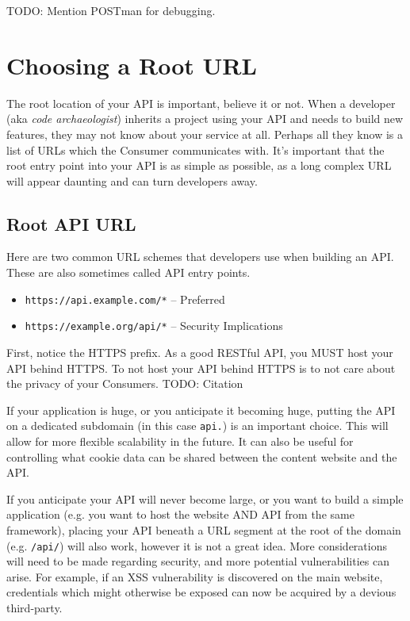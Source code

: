 \documentclass{book}
\begin{document}
TODO: Mention POSTman for debugging.


\section{Choosing a Root URL}

The root location of your API is important, believe it or not. When a developer (aka \emph{code archaeologist}) inherits a project using your API and needs to build new features, they may not know about your service at all. Perhaps all they know is a list of URLs which the Consumer communicates with. It's important that the root entry point into your API is as simple as possible, as a long complex URL will appear daunting and can turn developers away.

\subsection{Root API URL}

Here are two common URL schemes that developers use when building an API. These are also sometimes called API entry points.

\begin{itemize}
\item \texttt{https://api.example.com/*} -- Preferred
\item \texttt{https://example.org/api/*} -- Security Implications
\end{itemize}

First, notice the HTTPS prefix. As a good RESTful API, you MUST host your API behind HTTPS. To not host your API behind HTTPS is to not care about the privacy of your Consumers. TODO: Citation

If your application is huge, or you anticipate it becoming huge, putting the API on a dedicated subdomain (in this case \texttt{api.}) is an important choice. This will allow for more flexible scalability in the future. It can also be useful for controlling what cookie data can be shared between the content website and the API.

If you anticipate your API will never become large, or you want to build a simple application (e.g. you want to host the website AND API from the same framework), placing your API beneath a URL segment at the root of the domain (e.g. \texttt{/api/}) will also work, however it is not a great idea. More considerations will need to be made regarding security, and more potential vulnerabilities can arise. For example, if an XSS vulnerability is discovered on the main website, credentials which might otherwise be exposed can now be acquired by a devious third-party.
\end{document}
